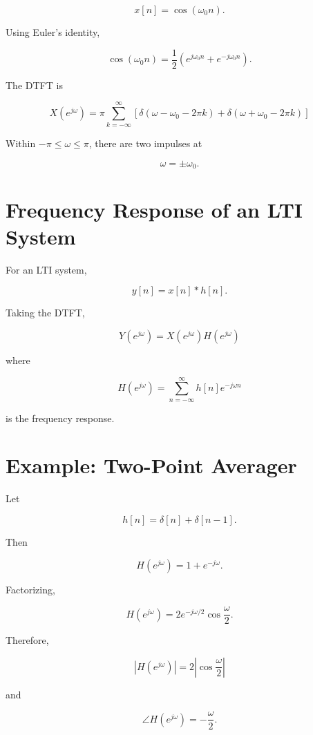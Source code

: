 \[
x[n]=\cos(\omega_0 n).
\]

Using Euler’s identity,

\[
\cos(\omega_0 n)=
\frac{1}{2}
\left(
e^{j\omega_0 n}+e^{-j\omega_0 n}
\right).
\]

The DTFT is

\[
\boxed{
X(e^{j\omega})=
\pi\sum_{k=-\infty}^{\infty}
\left[
\delta(\omega-\omega_0-2\pi k)
+\delta(\omega+\omega_0-2\pi k)
\right]
}
\]

Within \(-\pi\le\omega\le\pi\), there are two impulses at

\[
\boxed{
\omega=\pm\omega_0.
}
\]


\section{Frequency Response of an LTI System}

For an LTI system,

\[
y[n]=x[n]*h[n].
\]

Taking the DTFT,

\[
\boxed{
Y(e^{j\omega})=
X(e^{j\omega})H(e^{j\omega})
}
\]

where

\[
\boxed{
H(e^{j\omega})=
\sum_{n=-\infty}^{\infty}
h[n]e^{-j\omega n}
}
\]

is the frequency response.


\section{Example: Two-Point Averager}

Let

\[
h[n]=\delta[n]+\delta[n-1].
\]

Then

\[
H(e^{j\omega})=
1+e^{-j\omega}.
\]

Factorizing,

\[
H(e^{j\omega})=
2e^{-j\omega/2}\cos\frac{\omega}{2}.
\]

Therefore,

\[
\boxed{
|H(e^{j\omega})|=
2\left|\cos\frac{\omega}{2}\right|
}
\]

and

\[
\boxed{
\angle H(e^{j\omega})=-\frac{\omega}{2}.
}
\]

